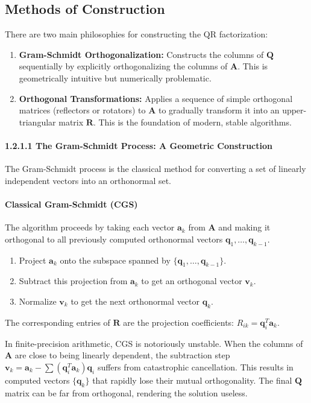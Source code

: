 \begin{proposition}
\subsection{Methods of Construction}
There are two main philosophies for constructing the QR factorization:
\begin{enumerate}
    \item \textbf{Gram-Schmidt Orthogonalization:} Constructs the columns of $\mathbf{Q}$ sequentially by explicitly orthogonalizing the columns of $\mathbf{A}$. This is geometrically intuitive but numerically problematic.
    \item \textbf{Orthogonal Transformations:} Applies a sequence of simple orthogonal matrices (reflectors or rotators) to $\mathbf{A}$ to gradually transform it into an upper-triangular matrix $\mathbf{R}$. This is the foundation of modern, stable algorithms.
\end{enumerate}

\paragraph{1.2.1.1 The Gram-Schmidt Process: A Geometric Construction}
The Gram-Schmidt process is the classical method for converting a set of linearly independent vectors into an orthonormal set.

\paragraph{Classical Gram-Schmidt (CGS)}
The algorithm proceeds by taking each vector $\mathbf{a}_k$ from $\mathbf{A}$ and making it orthogonal to all previously computed orthonormal vectors $\mathbf{q}_1, \dots, \mathbf{q}_{k-1}$.
\begin{enumerate}
    \item Project $\mathbf{a}_k$ onto the subspace spanned by $\{\mathbf{q}_1, \dots, \mathbf{q}_{k-1}\}$.
    \item Subtract this projection from $\mathbf{a}_k$ to get an orthogonal vector $\mathbf{v}_k$.
    \item Normalize $\mathbf{v}_k$ to get the next orthonormal vector $\mathbf{q}_k$.
\end{enumerate}
The corresponding entries of $\mathbf{R}$ are the projection coefficients: $R_{ik} = \mathbf{q}_i^T \mathbf{a}_k$.

\begin{remark}
In finite-precision arithmetic, CGS is notoriously unstable. When the columns of $\mathbf{A}$ are close to being linearly dependent, the subtraction step $\mathbf{v}_k = \mathbf{a}_k - \sum (\mathbf{q}_i^T\mathbf{a}_k)\mathbf{q}_i$ suffers from catastrophic cancellation. This results in computed vectors $\{\mathbf{q}_k\}$ that rapidly lose their mutual orthogonality. The final $\mathbf{Q}$ matrix can be far from orthogonal, rendering the solution useless.
\end{remark}


\end{proposition}
